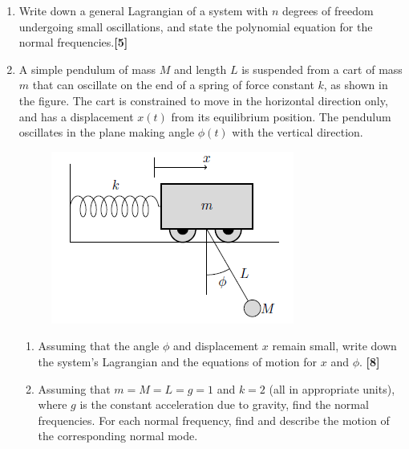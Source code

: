 \documentclass[a4paper]{article}
\begin{document}
\begin{qns}\leavevmode
\begin{enumerate}[label=(\alph*)]
\item Write down a general Lagrangian of a system with $n$ degrees of freedom undergoing small oscillations, and state the polynomial equation for the normal frequencies.\hfill\textbf{[5]}
\item A simple pendulum of mass $M$ and length $L$ is suspended from a cart of mass $m$ that can oscillate on the end of a spring of force constant $k$, as shown in the figure. The cart is constrained to move in the horizontal direction only, and has a displacement $x(t)$ from its equilibrium position. The pendulum oscillates in the plane making angle $\phi(t)$ with the vertical direction.
\begin{figure}[H]
    \centering
    \includegraphics[scale=0.95]{2018P2Q7.PNG}
\end{figure}
\begin{enumerate}[label=(\roman*)]
\item Assuming that the angle $\phi$ and displacement $x$ remain small, write down the system’s Lagrangian and the equations of motion for $x$ and $\phi$. \hfill\textbf{[8]}
\item Assuming that $m = M = L = g = 1$ and $k = 2$ (all in appropriate units), where $g$ is the constant acceleration due to gravity, find the normal frequencies. For each normal frequency, find and describe the motion of the corresponding normal mode.
\end{enumerate}
\end{enumerate}
\end{qns}
\newpage
\end{document}

